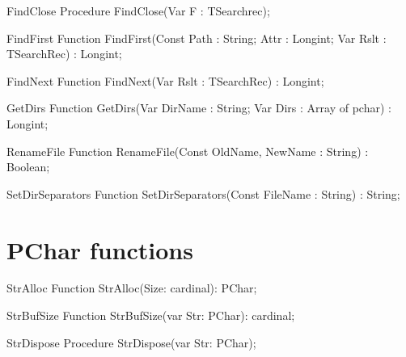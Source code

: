  
\begin{procedure}{FindClose}
\Declaration
Procedure FindClose(Var F : TSearchrec);
\Description
\Errors
\SeeAlso
\end{procedure}

 
\begin{function}{FindFirst}
\Declaration
Function FindFirst(Const Path : String; Attr : Longint; Var Rslt : TSearchRec) : Longint;
\Description
\Errors
\SeeAlso
\end{function}

 
\begin{function}{FindNext}
\Declaration
Function FindNext(Var Rslt : TSearchRec) : Longint;
\Description
\Errors
\SeeAlso
\end{function}

 
\begin{function}{GetDirs}
\Declaration
Function GetDirs(Var DirName : String; Var Dirs : Array of pchar) : Longint; 
\Description
\Errors
\SeeAlso
\end{function}

 
\begin{function}{RenameFile}
\Declaration
Function RenameFile(Const OldName, NewName : String) : Boolean;
\Description
\Errors
\SeeAlso
\end{function}

 
\begin{function}{SetDirSeparators}
\Declaration
Function SetDirSeparators(Const FileName : String) : String;
\Description
\Errors
\SeeAlso
\end{function}

 

\section{PChar functions}

\begin{function}{StrAlloc}
\Declaration
Function StrAlloc(Size: cardinal): PChar;
\Description
\Errors
\SeeAlso
\end{function}

 
\begin{function}{StrBufSize}
\Declaration
Function StrBufSize(var Str: PChar): cardinal;
\Description
\Errors
\SeeAlso
\end{function}

 
\begin{procedure}{StrDispose}
\Declaration
Procedure StrDispose(var Str: PChar);
\Description
\Errors
\SeeAlso
\end{procedure}

